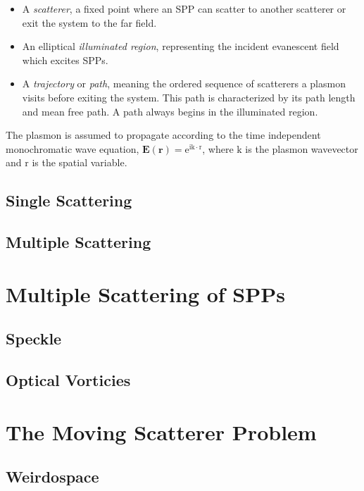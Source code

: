 \documentclass[a4paper,titlepage,onecolumn]{report}
\newcommand{\me}{{\mathrm{e}}}
\newcommand{\mi}{{\mathrm{i}}}
\begin{document}
\begin{itemize}

\item A \textit{scatterer}, a fixed point where an SPP can scatter to
another scatterer or exit the system to the far field.

\item An elliptical \textit{illuminated region}, representing the incident
evanescent field which excites SPPs.

\item A \textit{trajectory} or \textit{path}, meaning the ordered sequence
of scatterers a plasmon visits before exiting the system. This path is
characterized by its path length and mean free path. A path always begins
in the illuminated region.

\end{itemize}

The plasmon is assumed to propagate according to the time independent
monochromatic wave equation, $\mathbf{E}(\mathbf{r})=\me^{\mi
\mathrm{k}\cdot \mathrm{r}}$, where $\mathrm{k}$ is the plasmon wavevector
and $\mathrm{r}$ is the spatial variable.

\section{Single Scattering}

\section{Multiple Scattering}

\chapter{Multiple Scattering of SPPs}
\section{Speckle}
\section{Optical Vorticies}

\chapter{The Moving Scatterer Problem}
\section{Weirdospace}
\end{document}
